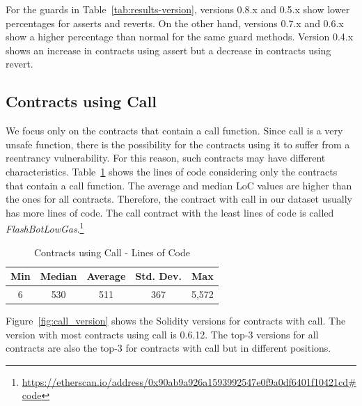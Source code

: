 \documentclass[10pt,conference]{IEEEtran}
\begin{document}
For the guards in Table~\ref{tab:results-version},  versions 0.8.x and 0.5.x show lower percentages for asserts and reverts.  On the other hand, versions 0.7.x and 0.6.x show a higher percentage than normal for the same guard methods. Version 0.4.x shows an increase in contracts using assert but a decrease in contracts using revert. 


\subsection{Contracts using Call}

We focus only on the contracts that contain a call function. Since call is a very unsafe function, there is the possibility for the contracts using it to suffer from a reentrancy vulnerability. For this reason, such contracts may have different characteristics. Table~\ref{tab:call-loc} shows the lines of code considering only the contracts that contain a call function. The average and median LoC values are higher than the ones for all contracts. Therefore, the contract with call in our dataset usually has more lines of code. The call contract with the least lines of code is called \textit{FlashBotLowGas}.\footnote{\url{https://etherscan.io/address/0x90ab9a926a1593992547e0f9a0df6401f10421cd\#code}}

\begin{table}[h]
\center
  \caption{Contracts using Call - Lines of Code}
  \label{tab:call-loc}
  \begin{tabular}{c c c c c}
    \hline
    Min & Median & Average & Std. Dev. & Max \\
    \hline
   6 & 530 & 511 & 367 & 5,572 \\
  \hline
\end{tabular}
\end{table}

Figure~\ref{fig:call_version} shows the Solidity versions for contracts with call. The version with most contracts using call is 0.6.12.  The top-3 versions for all contracts are also the top-3 for contracts with call but in different positions. 
\end{document}
